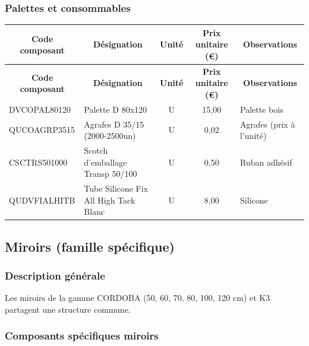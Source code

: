 \documentclass[12pt,a4paper]{article}
\begin{document}
\subsubsection{Palettes et consommables}

\begin{longtable}{|p{4cm}|p{7cm}|c|c|p{2cm}|}
\hline
\multicolumn{1}{|c|}{\textbf{Code composant}} & \multicolumn{1}{c|}{\textbf{Désignation}} & \multicolumn{1}{c|}{\textbf{Unité}} & \multicolumn{1}{c|}{\textbf{Prix unitaire (€)}} & \multicolumn{1}{c|}{\textbf{Observations}} \\
\hline
\endfirsthead
\hline
\multicolumn{1}{|c|}{\textbf{Code composant}} & \multicolumn{1}{c|}{\textbf{Désignation}} & \multicolumn{1}{c|}{\textbf{Unité}} & \multicolumn{1}{c|}{\textbf{Prix unitaire (€)}} & \multicolumn{1}{c|}{\textbf{Observations}} \\
\hline
\endhead
\hline
\endfoot
DVCOPAL80120 & Palette D 80x120 & U & 15,00 & Palette bois \\
QUCOAGRP3515 & Agrafes D 35/15 (2000-2500un) & U & 0,02 & Agrafes (prix à l'unité) \\
CSCTRS501000 & Scotch d'emballage Transp 50/100 & U & 0,50 & Ruban adhésif \\
QUDVFIALHITB & Tube Silicone Fix All High Tack Blanc & U & 8,00 & Silicone \\
\hline
\end{longtable}

\subsection{Miroirs (famille spécifique)}

\subsubsection{Description générale}
Les miroirs de la gamme CORDOBA (50, 60, 70, 80, 100, 120 cm) et K3 partagent une structure commune.

\subsubsection{Composants spécifiques miroirs}
\end{document}
